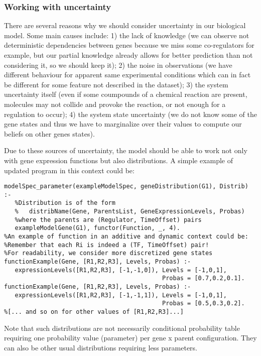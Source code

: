 \documentclass{article}
\begin{document}
\subsubsection{Working with uncertainty}

There are several reasons why we should consider uncertainty in our biological model. Some main causes include: 1) the lack of knowledge (we can observe not deterministic dependencies between genes because we miss some co-regulators for example, but our partial knowledge already allows for better prediction than not considering it, so we should keep it); 2) the noise in observations (we have different behaviour for apparent same experimental conditions which can in fact be different for some feature not described in the dataset); 3) the system uncertainty itself (even if some coumpounds of a chemical reaction are present, molecules may not collide and provoke the reaction, or not enough for a regulation to occur); 4) the system state uncertainty (we do not know some of the gene states and thus we have to marginalize over their values to compute our beliefs on other genes states). 

Due to these sources of uncertainty, the model should be able to work not only with gene expression functions but also distributions. A simple example of updated program in this context could be:
\begin{verbatim}
modelSpec_parameter(exampleModelSpec, geneDistribution(G1), Distrib) :-
   %Distribution is of the form 
   %   distribName(Gene, ParentsList, GeneExpressionLevels, Probas) 
   %where the parents are (Regulator, TimeOffset) pairs
   exampleModelGene(G1), functor(Function, _, 4).
%An example of function in an additive and dynamic context could be:
%Remember that each Ri is indeed a (TF, TimeOffset) pair!
%For readability, we consider more discretized gene states
functionExample(Gene, [R1,R2,R3], Levels, Probas) :- 
   expressionLevels([R1,R2,R3], [-1,-1,0]), Levels = [-1,0,1], 
                                            Probas = [0.7,0.2,0.1].
functionExample(Gene, [R1,R2,R3], Levels, Probas) :- 
   expressionLevels([R1,R2,R3], [-1,-1,1]), Levels = [-1,0,1], 
                                            Probas = [0.5,0.3,0.2].
%[... and so on for other values of [R1,R2,R3]...]
\end{verbatim}

Note that such distributions are not necessarily conditional probability table requiring one probability value (parameter) per gene x parent configuration. They can also be other usual distributions requiring less parameters.
\end{document}
